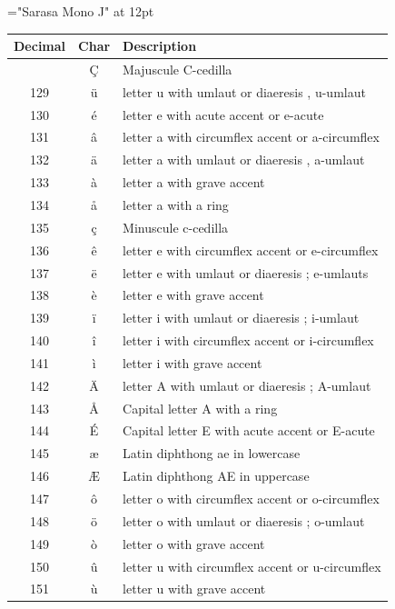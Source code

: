 {\font\rm="Sarasa Mono J" at 12pt \rm

\begin{longtable}{|c|c|l|}
\hline
\textbf{Decimal} & \textbf{Char} & \textbf{Description} \\
\hline
\endhead
\hline
\endfoot
\hline
\endlastfoot
128 & Ç & Majuscule C-cedilla \\
\hline
129 & ü & letter u with umlaut or diaeresis , u-umlaut \\
\hline
130 & é & letter e with acute accent or e-acute \\
\hline
131 & â & letter a with circumflex accent or a-circumflex \\
\hline
132 & ä & letter a with umlaut or diaeresis , a-umlaut \\
\hline
133 & à & letter a with grave accent \\
\hline
134 & å & letter a with a ring \\
\hline
135 & ç & Minuscule c-cedilla \\
\hline
136 & ê & letter e with circumflex accent or e-circumflex \\
\hline
137 & ë & letter e with umlaut or diaeresis ; e-umlauts \\
\hline
138 & è & letter e with grave accent \\
\hline
139 & ï & letter i with umlaut or diaeresis ; i-umlaut \\
\hline
140 & î & letter i with circumflex accent or i-circumflex \\
\hline
141 & ì & letter i with grave accent \\
\hline
142 & Ä & letter A with umlaut or diaeresis ; A-umlaut \\
\hline
143 & Å & Capital letter A with a ring \\
\hline
144 & É & Capital letter E with acute accent or E-acute \\
\hline
145 & æ & Latin diphthong ae in lowercase \\
\hline
146 & Æ & Latin diphthong AE in uppercase \\
\hline
147 & ô & letter o with circumflex accent or o-circumflex \\
\hline
148 & ö & letter o with umlaut or diaeresis ; o-umlaut \\
\hline
149 & ò & letter o with grave accent \\
\hline
150 & û & letter u with circumflex accent or u-circumflex \\
\hline
151 & ù & letter u with grave accent \\

\end{longtable}}
